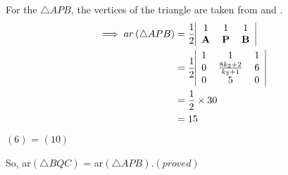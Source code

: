 \documentclass[12pt]{article}
\let\vec\mathbf
\providecommand{\brak}[1]{\ensuremath{\left(#1\right)}}
\begin{document}
For the $\triangle APB$, the vertices of the triangle are taken from  and .
   \begin{align}
  \implies ar\brak{\triangle APB} &=
\frac{1}{2}\begin{tabular}{|c c c|}            
1 &1&1\\                            
$\vec{A}$&$\vec{P}$&$\vec{B}$\\
\end{tabular}\\ &=  \frac{1}{2}
   \begin{tabular}{|c c c|}
       1 &1&1\\
       0&$\frac{8k_2+2}{k_2+1}$&6 \\
       0&5&0
   \end{tabular}\\
 &=\frac{1}{2} \times30\\
 &=15 \end{align}
 \brak{6} = \brak{10}


So, ar\brak{\triangle BQC} = ar\brak{\triangle APB}.\brak{proved}
\end{document}
